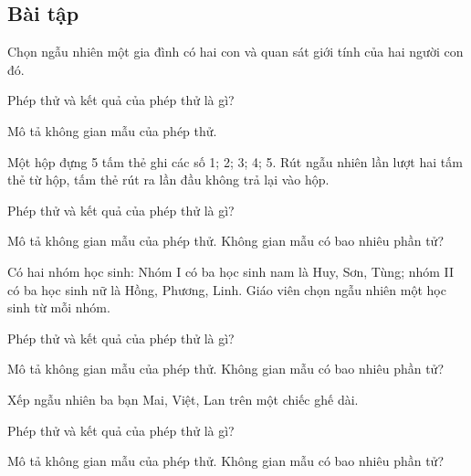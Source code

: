 \begin{exercises}
    \subsection{Bài tập}

    \begin{questions}[series=SGK]
        \item Chọn ngẫu nhiên một gia đình có hai con và quan sát giới tính của hai người con đó.
        \begin{questions}
            \item Phép thử và kết quả của phép thử là gì?
            \item Mô tả không gian mẫu của phép thử.
        \end{questions}

        \answerline
        \answerline

        \item Một hộp đựng 5 tấm thẻ ghi các số 1; 2; 3; 4; 5. Rút ngẫu nhiên lần lượt hai tấm thẻ từ hộp, tấm thẻ rút ra lần đầu không trả lại vào hộp.
        \begin{questions}
            \item Phép thử và kết quả của phép thử là gì?
            \item Mô tả không gian mẫu của phép thử. Không gian mẫu có bao nhiêu phần tử?
        \end{questions}

        \answerline
        \answerline

        \item Có hai nhóm học sinh: Nhóm I có ba học sinh nam là Huy, Sơn, Tùng; nhóm II có ba học sinh nữ là Hồng, Phương, Linh. Giáo viên chọn ngẫu nhiên một học sinh từ mỗi nhóm.
        \begin{questions}
            \item Phép thử và kết quả của phép thử là gì?
            \item Mô tả không gian mẫu của phép thử. Không gian mẫu có bao nhiêu phần tử?
        \end{questions}

        \answerline
        \answerline

        \item Xếp ngẫu nhiên ba bạn Mai, Việt, Lan trên một chiếc ghế dài.
        \begin{questions}
            \item Phép thử và kết quả của phép thử là gì?
            \item Mô tả không gian mẫu của phép thử. Không gian mẫu có bao nhiêu phần tử?
        \end{questions}

        \answerline
        \answerline
    \end{questions}
\end{exercises}

